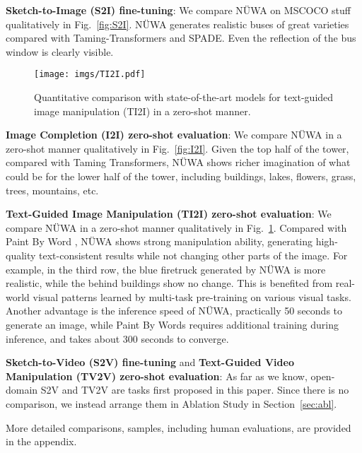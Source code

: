 \documentclass[10pt,twocolumn,letterpaper]{article}
\begin{document}
\textbf{Sketch-to-Image (S2I) fine-tuning}: We compare NÜWA on MSCOCO stuff\cite{linMicrosoftCocoCommon2014} qualitatively in Fig.~\ref{fig:S2I}. NÜWA generates realistic buses of great varieties compared with Taming-Transformers\cite{esserTamingTransformersHighResolution2021} and SPADE\cite{parkSemanticImageSynthesis2019}. Even the reflection of the bus window is clearly visible.

\begin{figure}[t]
	\centering
	\texttt{[image: imgs/TI2I.pdf]}
	\caption{Quantitative comparison with state-of-the-art models for text-guided image manipulation (TI2I) in a zero-shot manner.}
	\label{fig:TI2I}
	\vspace{-2mm}
\end{figure}

\textbf{Image Completion (I2I) zero-shot evaluation}: We compare NÜWA in a zero-shot manner qualitatively in Fig.~\ref{fig:I2I}. Given the top half of the tower, compared with Taming Transformers\cite{esserTamingTransformersHighResolution2021}, NÜWA shows richer imagination of what could be for the lower half of the tower, including buildings, lakes, flowers, grass, trees, mountains, etc.



\textbf{Text-Guided Image Manipulation (TI2I) zero-shot evaluation}: We compare NÜWA in a zero-shot manner qualitatively in Fig.~\ref{fig:TI2I}. Compared with Paint By Word \cite{bauPaintWord2021}, NÜWA shows strong manipulation ability, generating high-quality text-consistent results while not changing other parts of the image. For example, in the third row, the blue firetruck generated by NÜWA is more realistic, while the behind buildings show no change. This is benefited from real-world visual patterns learned by multi-task pre-training on various visual tasks. Another advantage is the inference speed of NÜWA, practically 50 seconds to generate an image, while Paint By Words requires additional training during inference, and takes about 300 seconds to converge.


\textbf{Sketch-to-Video (S2V) fine-tuning} and \textbf{Text-Guided Video Manipulation (TV2V) zero-shot evaluation}: As far as we know, open-domain S2V and TV2V are tasks first proposed in this paper. Since there is no comparison, we instead arrange them in Ablation Study in Section~\ref{sec:abl}.

More detailed comparisons, samples, including human evaluations, are provided in the appendix.
\end{document}
